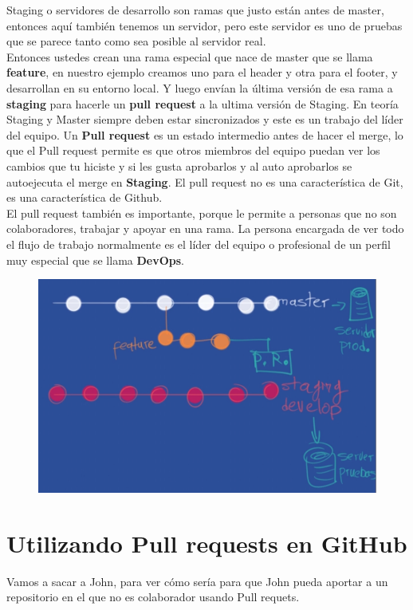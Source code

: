 \documentclass{article}
\begin{document}
Staging o servidores de desarrollo son ramas que justo están antes de master,
entonces aquí también tenemos un servidor, pero este servidor es uno de pruebas
que se parece tanto como sea posible al servidor real.\\

Entonces ustedes crean una rama especial que nace de master que se llama
\textbf{feature}, en nuestro ejemplo creamos uno para el header y otra para el
footer, y desarrollan en su entorno local. Y luego envían la última versión de
esa rama a \textbf{staging} para hacerle un \textbf{pull request} a la ultima
versión de Staging. En teoría Staging y Master siempre deben estar
sincronizados y este es un trabajo del líder del equipo. Un \textbf{Pull
request} es un estado intermedio antes de hacer el merge, lo que el Pull
request permite es que otros miembros del equipo puedan ver los cambios que tu
hiciste y si les gusta aprobarlos y al auto aprobarlos se autoejecuta el merge
en \textbf{Staging}. El pull request no es una característica de Git, es una
característica de Github.\\

El pull request también es importante, porque le permite a personas que no son
colaboradores, trabajar y apoyar en una rama. La persona encargada de ver todo
el flujo de trabajo normalmente es el líder del equipo o profesional de un
perfil muy especial que se llama \textbf{DevOps}.\\

\begin{figure}[h!]
  \centering
  \includegraphics[scale=0.5]{./Pictures/303_pull_request.png}
\end{figure}


\newpage
\section{Utilizando Pull requests en GitHub}%
Vamos a sacar a John, para ver cómo sería para que John pueda aportar a un
repositorio en el que no es colaborador  usando Pull requets.\\
\end{document}
